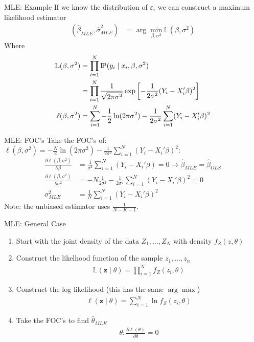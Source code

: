 \begin{frame}{MLE: Example}
If we know the distribution of $\varepsilon_i$ we can construct a \alert{maximum likelihood estimator}
\begin{align*}
(\widehat{\beta}_{MLE},\widehat{\sigma}^2_{MLE}) &= \arg \min_{\beta,\sigma^2} \mathbb{L}(\beta,\sigma^2)
\end{align*}
Where 
\begin{align*} 
\mathbb{L}(\beta,\sigma^2) &= \prod_{i=1}^N \text{I\kern-0.15em P}(y_i \mid x_i,\beta,\sigma^2) \\
                  &= \prod_{i=1}^N \frac{1}{\sqrt{2 \pi \sigma^2}} \exp \left[-\frac{1}{2\sigma^2}(Y_i - X_i' \beta)^2 \right]\\
\ell(\beta,\sigma^2) &= \sum_{i=1}^N -\frac{1}{2} \ln (2 \pi \sigma^2) - \frac{1}{2 \sigma^2} \sum_{i=1}^N(Y_i - X_i' \beta)^2
\end{align*}
\end{frame}

\begin{frame}{MLE: FOC's}
Take the FOC's of: 
$\ell(\beta,\sigma^2) = -\frac{N}{2} \ln (2 \pi \sigma^2) - \frac{1}{2 \sigma^2} \sum_{i=1}^N(Y_i - X_i' \beta)^2
$:
\begin{align*} 
\frac{ \partial \ell(\beta,\sigma^2) }{\partial \beta}&= \frac{1}{ \sigma^2}\sum_{i=1}^N(Y_i - X_i' \beta) = 0 \rightarrow \widehat{\beta}_{MLE}= \widehat{\beta}_{OLS}\\ 
\frac{ \partial \ell(\beta,\sigma^2) }{\partial \sigma^2}&= -N \frac{1}{2 \sigma^2}  -  \frac{1}{2 \sigma^4} \sum_{i=1}^N(Y_i - X_i' \beta)^2 = 0 \\
\sigma^2_{MLE} &= \frac{1}{N} \sum_{i=1}^N (Y_i - X_i' \beta)^2
\end{align*}
Note: the unbiased estimator uses $\frac{1}{N-K-1}$.
\end{frame}

\begin{frame}{MLE: General Case}
\begin{enumerate}
\item Start with the \alert{joint density of the data} $Z_1,\ldots,Z_N$ with density $f_Z(z,\theta)$
\item Construct the likelhood function of the sample $z_1,\ldots,z_n$
\begin{align*}
\mathbb{L}(\mathbf{z} \mid  \theta) = \prod_{i=1}^N f_Z(z_i,\theta)
\end{align*}
\item Construct the \alert{log likelihood} (this has the same $\arg \max$)
\begin{align*}
\ell(\mathbf{z} \mid \theta) = \sum_{i=1}^N \ln f_Z(z_i,\theta)
\end{align*}
\item Take the FOC's to find $\widehat{\theta}_{MLE}$
\begin{align*}
\theta : \frac{\partial \ell(\theta)}{\partial \theta} =0
\end{align*}
\end{enumerate}
\end{frame}

